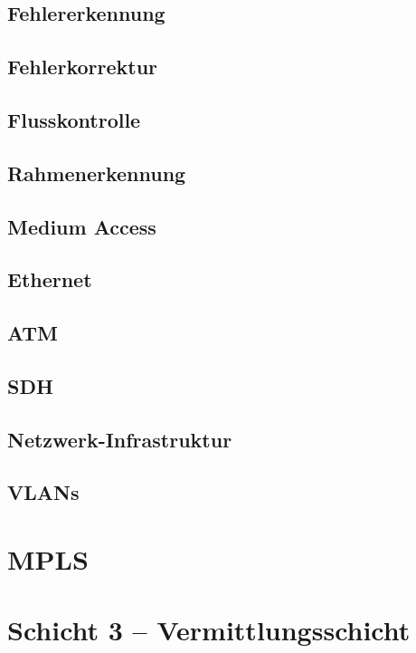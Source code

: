 \documentclass[a4paper,10pt]{scrartcl}
\begin{document}
\subsection{Fehlererkennung}
\subsection{Fehlerkorrektur}
\subsection{Flusskontrolle}
\subsection{Rahmenerkennung}
\subsection{Medium Access}
\subsection{Ethernet}
\subsection{ATM}
\subsection{SDH}
\subsection{Netzwerk-Infrastruktur}
\subsection{VLANs}

\section{MPLS}

\section{Schicht 3 -- Vermittlungsschicht}
\end{document}
